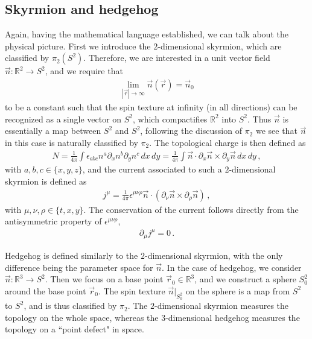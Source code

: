 \documentclass[11pt, onesided]{book}
\theoremstyle{break}
\theoremstyle{break}
\newcommand{\R}{\mathbb{R}}
\newcommand{\pd}{\partial}
\begin{document}
\subsection{Skyrmion and hedgehog}
Again, having the mathematical language established, we can talk about the physical picture. First we introduce the $2$-dimensional skyrmion, which are classified by $\pi_2(S^2)$. Therefore, we are interested in a unit vector field $\vec{n}:\R^2 \to S^2$, and we require that 
\begin{align*}
\lim_{|\vec{r}|\to\infty}\vec{n}(\vec{r}) = \vec{n}_0
\end{align*}
to be a constant such that the spin texture at infinity (in all directions) can be recognized as a single vector on $S^2$, which compactifies $\R^2$ into $S^2$. Thus $\vec{n}$ is essentially a map between $S^2$ and $S^2$, following the discussion of $\pi_2$ we see that $\vec{n}$ in this case is naturally classified by $\pi_2$. The topological charge is then defined as
\begin{align*}
N = \frac{1}{4\pi}\int \epsilon_{abc} n^a \pd_x n^b \pd_y n^c \, dx\, dy = \frac{1}{4\pi}\int \vec{n}\cdot \pd_x \vec{n}\times \pd_y \vec{n}\, dx\, dy\,,
\end{align*}
with $a,b,c\in\{x,y,z\}$, and the current associated to such a $2$-dimensional skyrmion is defined as
\begin{align*}
j^\mu = \frac{1}{4\pi}\epsilon^{\mu\nu\rho} \vec{n}\cdot (\pd_{\nu} \vec{n}\times \pd_{\rho} \vec{n})\,,
\end{align*}
with $\mu,\nu,\rho \in\{t,x,y\}$. The conservation of the current follows directly from the antisymmetric property of $\epsilon^{\mu\nu\rho}$, 
\begin{align*}
\pd_\mu j^\mu = 0\,.
\end{align*}

Hedgehog is defined similarly to the $2$-dimensional skyrmion, with the only difference being the parameter space for $\vec{n}$. In the case of hedgehog, we consider $\vec{n}: \R^3 \to S^2$. Then we focus on a base point $\vec{r}_0 \in \R^3$, and we construct a sphere $S^2_0$ around the base point $\vec{r}_0$. The spin texture $\vec{n}|_{S^2_0}$ on the sphere is a map from $S^2$ to $S^2$, and is thus classified by $\pi_2$. The $2$-dimensional skyrmion measures the topology on the whole space, whereas the $3$-dimensional hedgehog measures the topology on a ``point defect" in space. \\
\end{document}

